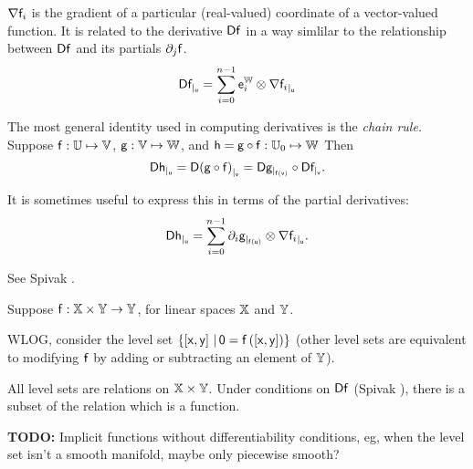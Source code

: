 ${\mathbf \nabla}{\mathsf{f}_i}$ is the gradient of a particular (real-valued) coordinate
of a vector-valued function. It is related to the derivative ${\mathsf{D}{\mathsf{f}}}$
in a way simlilar to the relationship between ${\mathsf{D}{\mathsf{f}}}$ and its partials ${\partial}_{j}{\mathsf{f}}$.
\begin{equation}
{\mathsf{D}{\mathsf{f}}_{\mid_{\mathsf{u}}}} = \sum_{i=0}^{n-1}  \mathsf{e}_i^{\mathbb{W}} \otimes {\mathbf \nabla}{\mathsf{f}_i}_{\mid_{\mathsf{u}}}
\end{equation}

The most general identity used in computing derivatives is the \textit{chain rule.}
Suppose
$\mathsf{f}:\mathbb{U} \mapsto \mathbb{V}$,
$\mathsf{g}:\mathbb{V} \mapsto \mathbb{W}$,
and
$\mathsf{h} = \mathsf{g} \circ \mathsf{f} : \mathbb{U}_0 \mapsto \mathbb{W}$
Then
\begin{equation}
\label{eq:chain-rule}
{\mathsf{D}{\mathsf{h}}_{\mid_{\mathsf{u}}}}
=  {\mathsf{D}{(\mathsf{g} \circ \mathsf{f})}_{\mid_{\mathsf{v}}}}
=  {\mathsf{D}{\mathsf{g}}_{\mid_{\mathsf{f}(\mathsf{v})}}}  \circ  {\mathsf{D}{\mathsf{f}}_{\mid_{\mathsf{v}}}}.
\end{equation}

It is sometimes useful to express this in terms of the partial derivatives:
\begin{equation}
\label{eq:chain-rule_partials}
{\mathsf{D}{\mathsf{h}}_{\mid_{\mathsf{u}}}} =  \sum_{i=0}^{n-1} {\partial}_{i}{\mathsf{g}}_{\mid_{\mathsf{f}(\mathsf{u})}} \otimes  {\mathbf \nabla}{\mathsf{f}_i}_{\mid_{\mathsf{u}}}.
\end{equation}

See Spivak \cite[Theorem~2-2]{spivak-1965}.

\label{sec:Derivatives-of-Vector-valued-functions}

\label{sec:Derivatives-of-implicit-functions}

Suppose 
$\mathsf{f} : \mathbb{X} \times \mathbb{Y} \rightarrow \mathbb{Y}$,
for linear spaces $\mathbb{X}$ and $\mathbb{Y}$.

WLOG, consider the level set 
$ \left\{ \left[ \mathsf{x} , \mathsf{y} \right] \, | \, \mathsf{0} = \mathsf{f}\left( \left[ \mathsf{x} , \mathsf{y} \right] \right) \right\} $
(other level sets are equivalent to modifying $\mathsf{f}$
by adding or subtracting 
an element of $\mathbb{Y}$).

All level sets are relations on $\mathbb{X} \times \mathbb{Y}$.
Under conditions on ${\mathsf{D}{\mathsf{f}}}$
(Spivak \cite[Theorem~2-12]{spivak-1965}),
there is a subset of the relation which is a 
function.

\textbf{TODO:} Implicit functions without differentiability
conditions, eg, when the level set isn't a smooth manifold,
maybe only piecewise smooth?

